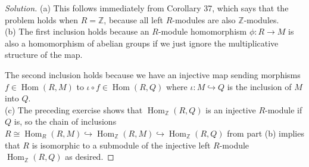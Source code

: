 \documentclass[10pt]{article}
\renewcommand{\hom}{\operatorname{Hom}}
\providecommand{\ZZ}{\mathbb Z}
\newenvironment{soln}{\begin{proof}[Solution]}{\end{proof}}
\begin{document}
\begin{soln}
    (a) This follows immediately from Corollary 37,
    which says that the problem holds when $R = \ZZ$,
    because all left $R$-modules are also $\ZZ$-modules.
    \\

    (b) The first inclusion holds because
    an $R$-module homomorphism $\phi\colon R\to M$
    is also a homomorphism of abelian groups
    if we just ignore the multiplicative structure of the map.
    
    The second inclusion holds because we have an injective map
    sending morphisms $f\in\hom(R,M)$ to $\iota\circ f\in\hom(R,Q)$ where
    $\iota\colon M\hookrightarrow Q$ is the inclusion of $M$ into $Q$.
    \\

    (c) The preceding exercise shows that
    $\hom_\ZZ(R,Q)$ is an injective $R$-module if $Q$ is,
    so the chain of inclusions
    $R\cong\hom_R(R,M)\hookrightarrow\hom_\ZZ(R,M)
    \hookrightarrow\hom_\ZZ(R,Q)$ from part (b)
    implies that $R$ is isomorphic to a submodule
    of the injective left $R$-module $\hom_\ZZ(R,Q)$
    as desired.
\end{soln}
\end{document}
